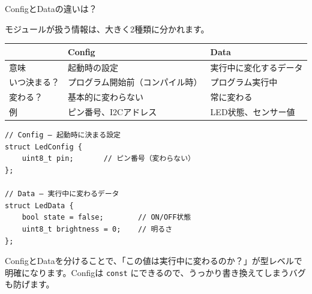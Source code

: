 \begin{qabox}{ConfigとDataの違いは？}

モジュールが扱う情報は、大きく2種類に分かれます。

\begin{center}
\begin{tabularx}{\textwidth}{l X X}
\toprule
& \textbf{Config} & \textbf{Data} \\
\midrule
意味 & 起動時の設定 & 実行中に変化するデータ \\
いつ決まる？ & プログラム開始前（コンパイル時） & プログラム実行中 \\
変わる？ & 基本的に変わらない & 常に変わる \\
例 & ピン番号、I2Cアドレス & LED状態、センサー値 \\
\bottomrule
\end{tabularx}
\end{center}

\begin{lstlisting}
// Config — 起動時に決まる設定
struct LedConfig {
    uint8_t pin;       // ピン番号（変わらない）
};

// Data — 実行中に変わるデータ
struct LedData {
    bool state = false;        // ON/OFF状態
    uint8_t brightness = 0;    // 明るさ
};
\end{lstlisting}

\begin{notebox}[なぜ分けるの？]
ConfigとDataを分けることで、「この値は実行中に変わるのか？」が型レベルで明確になります。Configは \texttt{const} にできるので、うっかり書き換えてしまうバグも防げます。
\end{notebox}

\end{qabox}
